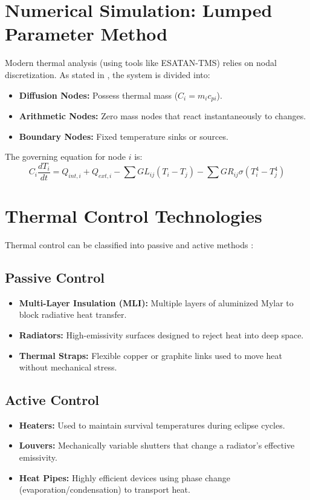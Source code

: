 \documentclass[12pt,a4paper]{report}
\begin{document}
\section{Numerical Simulation: Lumped Parameter Method}
Modern thermal analysis (using tools like ESATAN-TMS) relies on nodal discretization. As stated in \cite{th_background}, the system is divided into:
\begin{itemize}
    \item \textbf{Diffusion Nodes:} Possess thermal mass ($C_i = m_i c_{pi}$).
    \item \textbf{Arithmetic Nodes:} Zero mass nodes that react instantaneously to changes.
    \item \textbf{Boundary Nodes:} Fixed temperature sinks or sources.
\end{itemize}
The governing equation for node $i$ is:
\begin{equation}
    C_i \frac{dT_i}{dt} = Q_{int,i} + Q_{ext,i} - \sum GL_{ij}(T_i - T_j) - \sum GR_{ij}\sigma(T_i^4 - T_j^4)
\end{equation}

\section{Thermal Control Technologies}
Thermal control can be classified into passive and active methods \cite{TCS_Intro}:

\subsection{Passive Control}
\begin{itemize}
    \item \textbf{Multi-Layer Insulation (MLI):} Multiple layers of aluminized Mylar to block radiative heat transfer.
    \item \textbf{Radiators:} High-emissivity surfaces designed to reject heat into deep space.
    \item \textbf{Thermal Straps:} Flexible copper or graphite links used to move heat without mechanical stress.
\end{itemize}



\subsection{Active Control}
\begin{itemize}
    \item \textbf{Heaters:} Used to maintain survival temperatures during eclipse cycles.
    \item \textbf{Louvers:} Mechanically variable shutters that change a radiator's effective emissivity.
    \item \textbf{Heat Pipes:} Highly efficient devices using phase change (evaporation/condensation) to transport heat.
\end{itemize}
\end{document}

